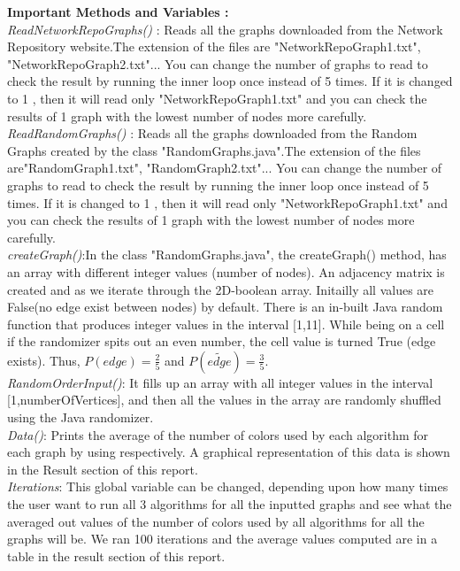 \documentclass{article}
\begin{document}
\textbf{Important Methods and Variables :}\\

\textit{ReadNetworkRepoGraphs() }: Reads all the graphs downloaded from the Network Repository website.The extension of the files are
 "NetworkRepoGraph1.txt", "NetworkRepoGraph2.txt"... You can change the number of graphs to read to check the result by running the inner
 loop once instead of 5 times. If it is changed to 1 , then it will read only "NetworkRepoGraph1.txt" and you can check the results of 1 graph with 
the lowest number of nodes more carefully. \\ 

 \textit{ReadRandomGraphs() }: Reads all the graphs downloaded from the Random Graphs created by the class "RandomGraphs.java".The
 extension of the files are"RandomGraph1.txt", "RandomGraph2.txt"... You can change the number of graphs to read to check the result by 
running the inner loop once instead of 5 times. If it is changed to 1 , then it will read only "NetworkRepoGraph1.txt" and you can check the
 results of 1 graph with the lowest number of nodes more carefully.\\

\textit{createGraph()}:In the class "RandomGraphs.java", the createGraph() method, has an array with different integer values (number of nodes).
 An adjacency matrix is created and as we iterate through the 2D-boolean array. Initailly all values are False(no edge exist between nodes)
 by default. There is an in-built Java random function that produces integer values in the interval [1,11]. While being on a cell if the randomizer spits out an even number, the cell value is turned True (edge exists). Thus, $P(edge)= \frac{2}{5}$ and $P(\widetilde{edge})=\frac{3}{5}$.\\ 

\textit{RandomOrderInput()}: It fills up an array with all integer values in the interval [1,numberOfVertices], and then all the values in the array are
randomly shuffled using the Java randomizer.\\

\textit{Data()}: Prints the average of the number of colors used by each algorithm for each graph by using respectively. A graphical representation 
of this data is shown in the Result section of this report.\\

\textit{Iterations}: This global variable can be changed, depending upon how many times the user want to run all 3 algorithms for all the inputted 
graphs and see what the averaged out values of the number of colors used by all algorithms for all the graphs will be. We ran 100 iterations and the 
average values computed are in a table in the result section of this report.\\
\end{document}
